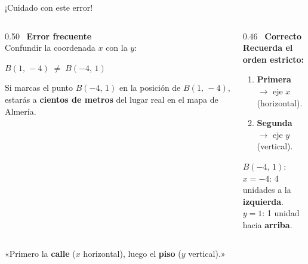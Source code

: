 \documentclass[aspectratio=169, 10pt, spanish]{beamer}
\begin{document}
\begin{frame}{¡Cuidado con este error!}
  \begin{errorbox}
    \begin{columns}[c]
      \begin{column}{0.50\textwidth}
        \incorrecto\ \textbf{Error frecuente}\\[6pt]
        Confundir la coordenada $x$ con la $y$:
        \begin{center}
          \AlmFontLarge
          $B(1,\,-4) \;\neq\; B(-4,\,1)$
        \end{center}
        \AlmFontFootnote
        Si marcas el punto $B(-4,\,1)$ en la posición
        de $B(1,\,-4)$, estarás a \textbf{cientos de metros}
        del lugar real en el mapa de Almería.
      \end{column}
      \begin{column}{0.46\textwidth}
        \correcto\ \textbf{Correcto}\\[6pt]
        \AlmFontSmall
        \textbf{Recuerda el orden estricto:}
        \begin{enumerate}
          \item \textbf{Primera} $\to$ eje $x$ (horizontal).
          \item \textbf{Segunda} $\to$ eje $y$ (vertical).
        \end{enumerate}
        \vspace{4pt}
        \AlmFontFootnote
        $B(-4,\,1)$:\\
        \quad$x = -4$: 4 unidades a la \textbf{izquierda}.\\
        \quad$y = 1$: 1 unidad hacia \textbf{arriba}.
      \end{column}
    \end{columns}
  \end{errorbox}
  \vspace{6pt}
  \begin{notabox}
    \AlmFontSmall
    «Primero la \textbf{calle} ($x$ horizontal),
    luego el \textbf{piso} ($y$ vertical).»
  \end{notabox}
\end{frame}
\end{document}
